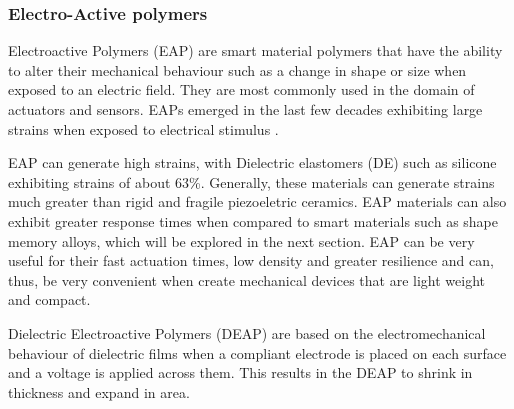 \subsubsection{Electro-Active polymers}
Electroactive Polymers (EAP) are smart material polymers that have the ability to alter their mechanical behaviour such as a change in shape or size when exposed to an electric field. They are most commonly used in the domain of actuators and sensors. EAPs emerged in the last few decades exhibiting large strains when exposed to electrical stimulus \cite{bar-cohen_artificial_2005}.

EAP can generate high strains, with Dielectric elastomers (DE) such as silicone exhibiting strains of about 63\%\cite{kornbluh_electroactive_2004}. Generally, these materials can generate strains much greater than rigid and fragile piezoeletric ceramics. EAP materials can also exhibit greater response times when compared to smart materials such as shape memory alloys, which will be explored in the next section. EAP can be very useful for their fast actuation times, low density and greater resilience and can, thus, be very convenient when create mechanical devices that are light weight and compact.

Dielectric Electroactive Polymers (DEAP) are based on the electromechanical behaviour of dielectric films when a compliant electrode is placed on each surface and a voltage is applied across them. This results in the DEAP to shrink in thickness and expand in area.

